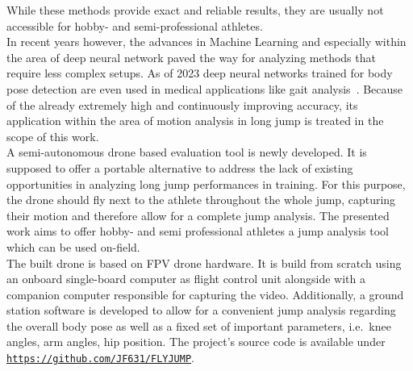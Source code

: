 \noindent While these methods provide exact and reliable results, they are 
usually not accessible for hobby- and semi-professional athletes.\\
In recent years however, the advances in Machine Learning and especially within the area 
of deep neural network paved the way for analyzing methods that require less 
complex setups.
As of 2023 deep neural networks trained for body pose detection are even used 
in medical applications like gait analysis~\cite{mp_gait_analysis}.
Because of the already extremely high and continuously improving accuracy, 
its application within the area of motion analysis in long jump is treated in 
the scope of this work.\\
A semi-autonomous drone based evaluation tool is newly developed.
It is supposed to offer a portable alternative to address the lack of existing
opportunities in analyzing long jump performances in training.
For this purpose, the drone should fly next to the athlete 
throughout the whole jump, capturing their motion and therefore allow for a 
complete jump analysis.
The presented work aims to offer hobby- and semi professional athletes a jump
analysis tool which can be used on-field.\\
The built drone is based on \ac{FPV} drone hardware.
It is build from scratch using an onboard single-board computer as flight 
control unit alongside with a companion computer responsible for capturing the
video.
Additionally, a ground station software is developed to allow for a convenient
jump analysis regarding the overall body pose as well as a fixed set of 
important parameters, i.e.~knee angles, arm angles, hip position. 
The project's source code is available under \texttt{\url{https://github.com/JF631/FLYJUMP}}.
